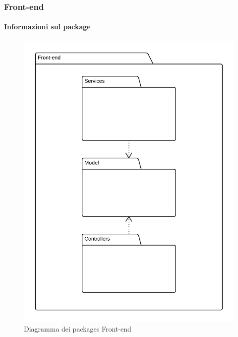 
	\subsubsection{Front-end}
	\paragraph{Informazioni sul package} 
		\begin{figure}[H] 
			\begin{center} 
				\includegraphics[scale=0.20]{uml/package/Front-end.png}  
				\caption{Diagramma dei packages Front-end}
			\end{center}  
		\end{figure} 
		
